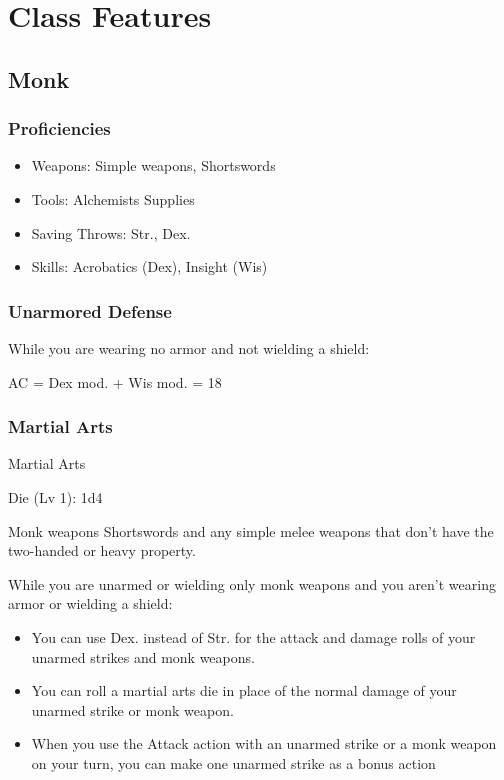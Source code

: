 \documentclass[10pt,twoside,twocolumn,openany]{book}
\begin{document}
	
\chapter{Class Features}
\section{Monk}
	\subsection{Proficiencies}
		\begin{itemize}
			\item Weapons: Simple weapons, Shortswords
			\item Tools: Alchemists Supplies  
			\item Saving Throws: Str., Dex. 
			\item Skills: Acrobatics (Dex), Insight (Wis)
		\end{itemize}
	\subsection{Unarmored Defense}
		While you are wearing no armor and not wielding a shield:
		\begin{quotebox}
			AC = Dex mod. + Wis mod. = 18
		\end{quotebox} 
	
	\subsection{Martial Arts}
		\begin{quotebox}
			\hypertarget{ma}{Martial Arts} Die (Lv 1): 1d4
		\end{quotebox}
		\begin{commentbox}{Monk weapons}
			 Shortswords and any simple melee weapons that don't have the two-handed or heavy property.
		\end{commentbox}
		
		While you are unarmed or wielding only monk weapons and you aren't wearing armor or wielding a shield:

		\begin{itemize}
			\item You can use Dex. instead of Str. for the attack and damage rolls of your unarmed strikes and monk weapons.
			
			\item You can roll a martial arts die in place of the normal damage of your unarmed strike or monk weapon.
			
			\item When you use the Attack action with an unarmed strike or a monk weapon on your turn, you can make one unarmed strike as a bonus action
		\end{itemize}
		
\end{document}
